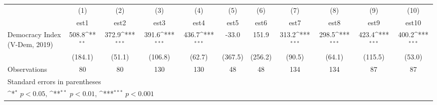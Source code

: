 {
\def\sym#1{\ifmmode^{#1}\else\(^{#1}\)\fi}
\begin{tabular}{l*{10}{c}}
\hline\hline
                    &\multicolumn{1}{c}{(1)}         &\multicolumn{1}{c}{(2)}         &\multicolumn{1}{c}{(3)}         &\multicolumn{1}{c}{(4)}         &\multicolumn{1}{c}{(5)}         &\multicolumn{1}{c}{(6)}         &\multicolumn{1}{c}{(7)}         &\multicolumn{1}{c}{(8)}         &\multicolumn{1}{c}{(9)}         &\multicolumn{1}{c}{(10)}         \\
                    &        est1         &        est2         &        est3         &        est4         &        est5         &        est6         &        est7         &        est8         &        est9         &       est10         \\
\hline
Democracy Index (V-Dem, 2019)&       508.8\sym{**} &       372.9\sym{***}&       391.6\sym{***}&       436.7\sym{***}&       -33.0         &       151.9         &       313.2\sym{***}&       298.5\sym{***}&       423.4\sym{***}&       400.2\sym{***}\\
                    &     (184.1)         &      (51.1)         &     (106.8)         &      (62.7)         &     (367.5)         &     (256.2)         &      (90.5)         &      (64.1)         &     (115.5)         &      (53.0)         \\
\hline
Observations        &          80         &          80         &         130         &         130         &          48         &          48         &         134         &         134         &          87         &          87         \\
\hline\hline
\multicolumn{11}{l}{\footnotesize Standard errors in parentheses}\\
\multicolumn{11}{l}{\footnotesize \sym{*} \(p<0.05\), \sym{**} \(p<0.01\), \sym{***} \(p<0.001\)}\\
\end{tabular}
}

